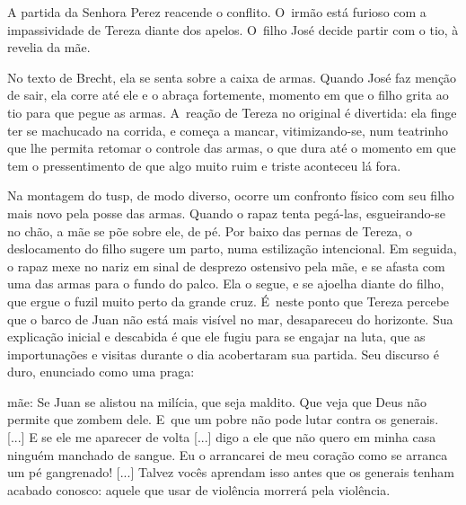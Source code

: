 {A partida da Senhora Perez reacende o conflito. O~irmão está furioso com
a impassividade de Tereza diante dos apelos. O~filho José decide partir
com o tio, à revelia da mãe.

No texto de Brecht, ela se senta sobre a caixa de armas. Quando José faz
menção de sair, ela corre até ele e o abraça fortemente, momento em que
o filho grita ao tio para que pegue as armas. A~reação de Tereza no
original é divertida: ela finge ter se machucado na corrida, e começa a
mancar, vitimizando-se, num teatrinho que lhe permita retomar o controle
das armas, o que dura até o momento em que tem o pressentimento de que algo
muito ruim e triste aconteceu lá fora.

Na montagem do {\sc tusp}, de modo diverso, ocorre um confronto físico com seu
filho mais novo pela posse das armas. Quando o rapaz tenta pegá-las,
esgueirando-se no chão, a mãe se põe sobre ele, de pé. Por baixo das
pernas de Tereza, o deslocamento do filho sugere um parto, numa
estilização intencional. Em seguida, o rapaz mexe no nariz em sinal de
desprezo ostensivo pela mãe, e se afasta com uma das armas para o fundo
do palco. Ela o segue, e se ajoelha diante do filho, que ergue o fuzil
muito perto da grande cruz. É~neste ponto que Tereza percebe que o barco
de Juan não está mais visível no mar, desapareceu do horizonte. Sua
explicação inicial e descabida é que ele fugiu para se engajar na luta,
que as importunações e visitas durante o dia acobertaram sua partida.
Seu discurso é duro, enunciado como uma praga:

\startblockquote
{\sc mãe}: Se Juan se alistou na milícia, que seja maldito. Que veja que Deus
não permite que zombem dele. E~que um pobre não pode lutar contra os
generais. {[}...{]} E se ele me aparecer de volta {[}...{]} digo a ele
que não quero em minha casa ninguém manchado de sangue. Eu o arrancarei
de meu coração como se arranca um pé gangrenado! {[}...{]} Talvez vocês
aprendam isso antes que os generais tenham acabado conosco: aquele que
usar de violência morrerá pela violência.
\stopblockquote



}

